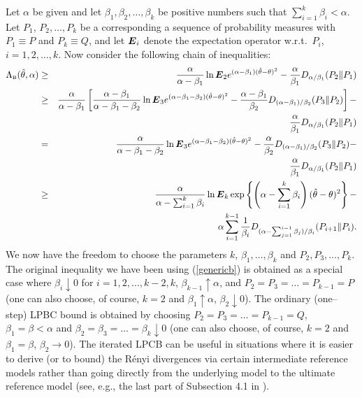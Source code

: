 \documentclass[11pt,epsf]{article}
\newcommand{\ct}{\hat{\theta}}
\newcommand {\bE} {\mbox{\boldmath $E$}}
\begin{document}
Let $\alpha$ be given and let $\beta_1,\beta_2,\ldots,\beta_k$ be positive
numbers such that $\sum_{i=1}^k\beta_i < \alpha$. Let $P_1$, $P_2,\ldots, P_k$ be a
corresponding a sequence of probability measures with $P_1\equiv P$ and
$P_k\equiv Q$, and let $\bE_i$ denote the expectation operator w.r.t.\ $P_i$,
$i=1,2,\ldots,k$.
Now consider the following chain of inequalities:
\begin{eqnarray}
\Lambda_{\mbox{\tiny B}}(\ct,\alpha)&\ge&
\frac{\alpha}{\alpha-\beta_1}\ln\bE_2
e^{(\alpha-\beta_1)(\ct-\theta)^2}-\frac{\alpha}{\beta_1}D_{\alpha/\beta_1}(P_2\|P_1)\\
&\ge&
\frac{\alpha}{\alpha-\beta_1}\left[\frac{\alpha-\beta_1}{\alpha-\beta_1-\beta_2}\ln\bE_3
e^{(\alpha-\beta_1-\beta_2)(\ct-\theta)^2}-\frac{\alpha-\beta_1}{\beta_2}
D_{(\alpha-\beta_1)/\beta_2}(P_3\|P_2)\right]-\nonumber\\
& &\frac{\alpha}{\beta_1}D_{\alpha/\beta_1}(P_2\|P_1)\\
&=&
\frac{\alpha}{\alpha-\beta_1-\beta_2}\ln\bE_3
e^{(\alpha-\beta_1-\beta_2)(\ct-\theta)^2}-\frac{\alpha}{\beta_2}
D_{(\alpha-\beta_1)/\beta_2}(P_3\|P_2)-\nonumber\\
& &\frac{\alpha}{\beta_1}D_{\alpha/\beta_1}(P_2\|P_1)\\
&\ge&\frac{\alpha}{\alpha-\sum_{i=1}^k\beta_i}\ln\bE_k
\exp\left\{\left(\alpha-\sum_{i=1}^k\beta_i\right)(\ct-\theta)^2\right\}-\nonumber\\
& &\alpha\sum_{i=1}^{k-1}\frac{1}{\beta_i}
D_{(\alpha-\sum_{j=1}^{i-1}\beta_j)/\beta_i}(P_{i+1}\|P_i).
\end{eqnarray}
We now have the freedom to choose the
parameters $k$, $\beta_1,\ldots,\beta_k$ and $P_2, P_3,\ldots,P_k$.
The original inequality we have been using (\ref{genericb}) is obtained as a special case where
$\beta_i\downarrow 0$ for $i=1,2,\ldots,k-2,k$, $\beta_{k-1}\uparrow \alpha$,
and $P_2=P_3=\ldots=P_{k-1}=P$ (one can also choose, of course, $k=2$ and
$\beta_1\uparrow\alpha$, $\beta_2\downarrow 0$).
The ordinary (one--step) LPBC bound is obtained by choosing
$P_2=P_3=\ldots=P_{k-1}=Q$, $\beta_1=\beta < \alpha$ and
$\beta_2=\beta_3=\ldots=\beta_k\downarrow 0$
(one can also choose, of course, $k=2$ and
$\beta_1=\beta$, $\beta_2\to 0$). The iterated LPCB can be useful in
situations where it is easier to derive (or to bound) the R\'enyi divergences
via certain intermediate reference models rather than going directly from the
underlying model to the ultimate reference model (see, e.g., the last part of
Subsection 4.1 in \cite{AM15}).
\end{document}

